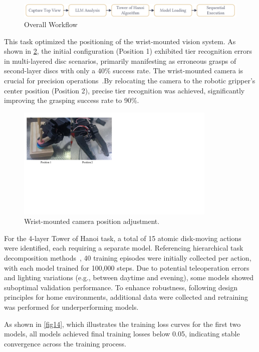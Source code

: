 \documentclass[runningheads]{llncs}
\begin{document}
\begin{figure}[htbp]
\centering
\includegraphics[width=\textwidth]{10}
\caption{Overall Workflow}
 \label{fig10}
\end{figure}

This task optimized the positioning of the wrist-mounted vision system. As shown in \cref{fig12}, the initial configuration (Position 1) exhibited tier recognition errors in multi-layered disc scenarios, primarily manifesting as erroneous grasps of second-layer discs with only a 40\% success rate. The wrist-mounted camera is crucial for precision operations~\cite{ref6}.By relocating the camera to the robotic gripper's center position (Position 2), precise tier recognition was achieved, significantly improving the grasping success rate to 90\%.

\begin{figure}[htbp]
\includegraphics[width=0.85\textwidth]{fig12.pdf}
\caption{Wrist-mounted camera position adjustment.} \label{fig12}
\end{figure}



For the 4-layer Tower of Hanoi task, a total of 15 atomic disk-moving actions were identified, each requiring a separate model. Referencing hierarchical task decomposition methods~\cite{ref7}, 40 training episodes were initially collected per action, with each model trained for 100,000 steps. Due to potential teleoperation errors and lighting variations (e.g., between daytime and evening)\cite{ref8}, some models showed suboptimal validation performance. To enhance robustness, following design principles for home environments\cite{ref9}, additional data were collected and retraining was performed for underperforming models.

As shown in \cref{fig14}, which illustrates the training loss curves for the first two models, all models achieved final training losses below 0.05, indicating stable convergence across the training process.
\end{document}
